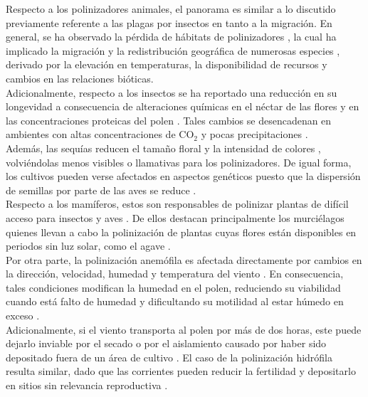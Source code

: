 \begin{itemize}[leftmargin=0cm, itemsep=0.5 cm]
{	Respecto a los polinizadores animales, el panorama es similar a lo discutido previamente referente a las plagas por insectos en tanto a la migración. En general, se ha observado la pérdida de hábitats de polinizadores \cite{Memmott_2007}, la cual ha implicado la migración y la redistribución geográfica de numerosas especies \cite{Kumar_2024, Sherwin_2012, Rafferty_2017}, derivado por la elevación en temperaturas, la disponibilidad de recursos y cambios en las relaciones bióticas.\\
	
	Adicionalmente, respecto a los insectos se ha reportado una reducción en su longevidad a consecuencia de alteraciones químicas en el néctar de las flores y en las concentraciones proteicas del polen \cite{Hoover_2012, Ziska_2016}. Tales cambios se desencadenan en ambientes con altas concentraciones de CO$_2$ y pocas precipitaciones \cite{Rafferty_2017}.\\
	
	Además, las sequías reducen el tamaño floral y la intensidad de colores \cite{Burkle_2016, Rafferty_2017}, volviéndolas menos visibles o llamativas para los polinizadores. De igual forma, los cultivos pueden verse afectados en aspectos genéticos puesto que la dispersión de semillas por parte de las aves se reduce \cite{Anderson_2016}.\\
	
	Respecto a los mamíferos, estos son responsables de polinizar plantas de difícil acceso para insectos y aves \cite{Carthew_1997}. De ellos destacan principalmente los murciélagos quienes llevan a cabo la polinización de plantas cuyas flores están disponibles en periodos sin luz solar, como el agave \cite{Trejo-Salazar_2016}.\\
	
	Por otra parte, la polinización anemófila es afectada directamente por cambios en la dirección, velocidad, humedad y temperatura del viento \cite{Cresswell_2010}. En consecuencia, tales condiciones modifican la humedad en el polen, reduciendo su viabilidad cuando está falto de humedad y dificultando su motilidad al estar húmedo en exceso \cite{Fonseca_2005}.\\
	
	Adicionalmente, si el viento transporta al polen por más de dos horas, este puede dejarlo inviable por el secado o por el aislamiento causado por haber sido depositado fuera de un área de cultivo \cite{Luna_2001}. El caso de la polinización hidrófila resulta similar, dado que las corrientes pueden reducir la fertilidad y depositarlo en sitios sin relevancia reproductiva \cite{Ackerman_2000}.\\
	
}
\end{itemize}
